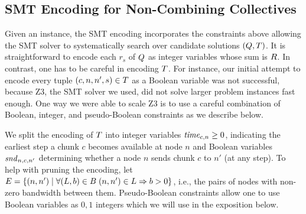 \subsection{SMT Encoding for Non-Combining Collectives}
\label{sec:encoding}

Given an instance, the SMT encoding incorporates the constraints above
allowing the SMT solver to systematically search over candidate
solutions $(Q, T)$. It is straightforward to encode each
$r_s$ of $Q$ as integer variables whose sum is $R$. In
contrast, one has to be careful in encoding $T$. For instance,
our initial attempt to encode every tuple $(c, n, n', s) \in T$
as a Boolean variable was not successful, because Z3, the SMT solver
we used, did not solve larger problem instances fast enough. One way
we were able to scale Z3 is to use a careful combination of Boolean,
integer, and pseudo-Boolean constraints as we describe below.

We split the encoding of $T$ into integer variables $\mathit{time}_{c,n}
\geq 0$, indicating the earliest step a chunk $c$ becomes available at
node $n$ and Boolean variables $\mathit{snd}_{n,c,n'}$ determining whether a
node $n$ sends chunk $c$ to $n'$ (at any step).
\newcommand{\edges}{E}
To help with pruning the encoding, let $\edges=\{(n,n') \setwhere
\allowbreak \forall (L,b)\in\bw \qst (n,n')\in L \Rightarrow b > 0\}$,
i.e., the pairs of nodes with non-zero bandwidth between them.
Pseudo-Boolean constraints allow one to use Boolean variables as $0,1$
integers which we will use in the exposition below.

